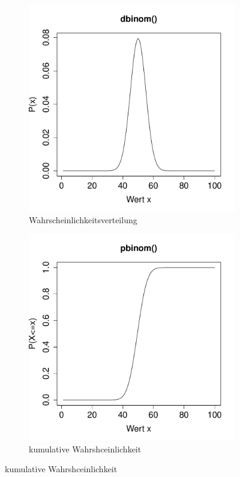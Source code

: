 \begin{figure}[h!]
\centering
\begin{subfigure}[b]{0.48\textwidth}
\includegraphics{verteilungen-010}
\caption{Wahrscheinlichkeitsverteilung}
\end{subfigure}
\begin{subfigure}[b]{0.48\textwidth}
\includegraphics{verteilungen-011}
\caption{kumulative Wahrshceinlichkeit}
\end{subfigure}


\end{figure}
